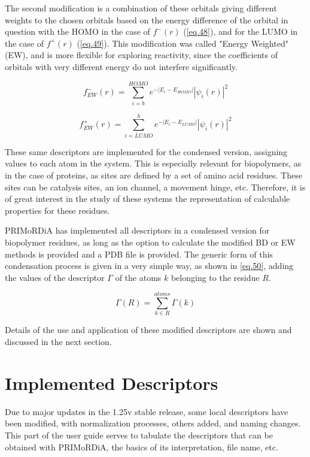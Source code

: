 \documentclass[a4paper,11pt]{refart}
\begin{document}
	The second modification is a combination of these orbitals giving different weights to the chosen orbitals based on the energy difference of the orbital in question with the HOMO in the case of $f^-(r)$ (\autoref{eq.48}), and for the LUMO in the case of $f^+(r)$ (\autoref{eq.49}). This modification was called "Energy Weighted" (EW), and is more flexible for exploring reactivity, since the coefficients of orbitals with very different energy do not interfere significantly.

	\begin{equation}
	f^-_{EW}(r) = \sum^{HOMO}_{i=b} e^{-|E_{i}-E_{HOMO}|}|\psi_i(r)|^2
	\label{eq.48}
	\end{equation}

	\begin{equation}
	f^+_{EW}(r) = \sum^{b}_{i=LUMO} e^{-|E_{i}-E_{LUMO}|} |\psi_i(r)|^2
	\label{eq.49}
	\end{equation}

These same descriptors are implemented for the condensed version, assigning values to each atom in the system. This is especially relevant for biopolymers, as in the case of proteins, as sites are defined by a set of amino acid residues. These sites can be catalysis sites, an ion channel, a movement hinge, etc. Therefore, it is of great interest in the study of these systems the representation of calculable properties for these residues.

PRIMoRDiA has implemented all descriptors in a condensed version for biopolymer residues, as long as the option to calculate the modified BD or EW methods is provided and a PDB file is provided. The generic form of this condensation process is given in a very simple way, as shown in \autoref{eq.50}, adding the values of the descriptor $\Gamma$ of the atoms $k$ belonging to the residue $R$.

\begin{equation}
\Gamma(R) = \sum_{k \in R }^{atoms} \Gamma(k)
\label{eq.50}
\end{equation}

Details of the use and application of these modified descriptors are shown and discussed in the next section.

\newpage
\section{Implemented Descriptors}

Due to major updates in the 1.25v stable release, some local descriptors have been modified, with normalization processes, others added, and naming changes. This part of the user guide serves to tabulate the descriptors that can be obtained with PRIMoRDiA, the basics of its interpretation, file name, etc.
\end{document}
